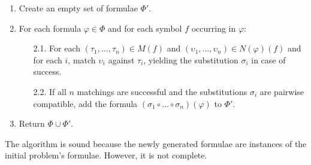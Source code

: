 \documentclass[runningheads]{llncs}
\begin{document}
\begin{enumerate}

   \item Create an empty set of formulae \(\Phi'\).

\pagebreak[2]

   \item For each formula \(\varphi \in \Phi\) and for each symbol \(f\) occurring in \(\varphi\):
   \begin{enumerate}
    \item[2.1.] For each \((\tau_1, \dots, \tau_n) \in  M(f)\) and \((\upsilon_1, \dots, \upsilon_n) \in N(\varphi)(f)\) and
     for each \(i\), match \(\upsilon_i\) against \(\tau_i\), yielding the substitution \(\sigma_i\) in case of success.

    \item[2.2.] If all \(n\) matchings are successful and the substitutions \(\sigma_i\) are pairwise compatible,
add the formula \((\sigma_1 \circ \dots \circ \sigma_n)(\varphi)\) to \(\Phi'\).
   \end{enumerate}

   \item Return \(\Phi \cup \Phi'\).

\end{enumerate}

The algorithm is sound because the newly generated formulae are instances of the initial problem's formulae. %
However, it is not complete.
\end{document}
